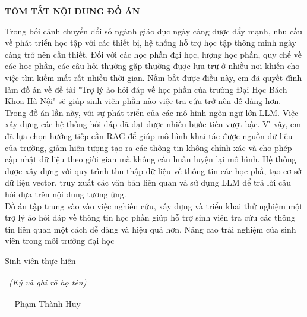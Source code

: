 \documentclass[../DoAn.tex]{subfiles}
\begin{document}
\begin{center}
    \Large{\textbf{TÓM TẮT NỘI DUNG ĐỒ ÁN}}\\
\end{center}
\vspace{1cm}
Trong bối cảnh chuyển đổi số ngành giáo dục ngày càng được đẩy mạnh, nhu cầu về phát triển học tập với các thiết bị, hệ thống hỗ trợ học tập thông minh ngày càng trở nên cần thiết. Đối với các học phần đại học, lượng học phần, quy chế về các học phần, các câu hỏi thường gặp thường được lưu trữ ở nhiều nơi khiến cho việc tìm kiếm mất rất nhiều thời gian. Nắm bắt được điều này, em đã quyết đình làm đồ án về đề tài "Trợ lý ảo hỏi đáp về học phần của trường Đại Học Bách Khoa Hà Nội" sẽ giúp sinh viên phần nào việc tra cứu trở nên dễ dàng hơn.\\
Trong đồ án lần này, với sự phát triển của các mô hình ngôn ngữ lớn LLM. Việc xây dựng các hệ thống hỏi đáp đã đạt được nhiều bước tiến vượt bậc. Vì vậy, em đã lựa chọn hướng tiếp cần RAG để giúp mô hình khai tác được nguồn dữ liệu của trường, giảm hiện tượng tạo ra các thông tin không chính xác và cho phép cập nhật dữ liệu theo giời gian mà không cần huấn luyện lại mô hình. Hệ thống được xây dựng với quy trình thu thập dữ liệu về thông tin các học phầ, tạo cơ sở dữ liệu vector, truy xuất các văn bản liên quan và sử dụng LLM để trả lời câu hỏi dựa trên nội dung tương ứng.\\
Đồ án tập trung vào vào việc nghiên cứu, xây dựng và triển khai thử nghiệm một trợ lý ảo hỏi đáp về thông tin học phần giúp hỗ trợ sinh viên tra cứu các thông tin liên quan một cách dễ dàng và hiệu quả hơn. Nâng cao trải nghiệm của sinh viên trong môi trường đại học


\begin{flushright}
Sinh viên thực hiện\\
\begin{tabular}{@{}c@{}}
\textit{(Ký và ghi rõ họ tên)} \\ \\ \\
Phạm Thành Huy
\end{tabular}
\end{flushright}
\end{document}
